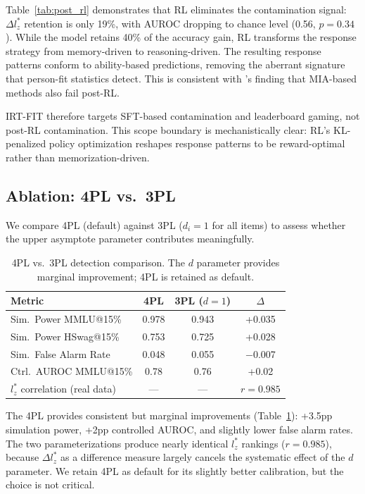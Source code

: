 \documentclass[11pt,a4paper]{article}
\begin{document}
Table~\ref{tab:post_rl} demonstrates that RL eliminates the contamination signal: $\Delta l_z^*$ retention is only 19\%, with AUROC dropping to chance level (0.56, $p=0.34$). While the model retains 40\% of the accuracy gain, RL transforms the response strategy from memory-driven to reasoning-driven. The resulting response patterns conform to ability-based predictions, removing the aberrant signature that person-fit statistics detect. This is consistent with \citet{wang2025contamination}'s finding that MIA-based methods also fail post-RL.

IRT-FIT therefore targets SFT-based contamination and leaderboard gaming, not post-RL contamination. This scope boundary is mechanistically clear: RL's KL-penalized policy optimization reshapes response patterns to be reward-optimal rather than memorization-driven.


\subsection{Ablation: 4PL vs.\ 3PL}
\label{sec:ablation}

We compare 4PL (default) against 3PL ($d_i=1$ for all items) to assess whether the upper asymptote parameter contributes meaningfully.

\begin{table}[t]
\centering
\small
\caption{4PL vs.\ 3PL detection comparison. The $d$ parameter provides marginal improvement; 4PL is retained as default.}
\label{tab:4pl3pl}
\begin{tabular}{lccc}
\toprule
Metric & 4PL & 3PL ($d{=}1$) & $\Delta$ \\
\midrule
Sim.\ Power MMLU@15\% & 0.978 & 0.943 & +0.035 \\
Sim.\ Power HSwag@15\% & 0.753 & 0.725 & +0.028 \\
Sim.\ False Alarm Rate & 0.048 & 0.055 & $-$0.007 \\
Ctrl.\ AUROC MMLU@15\% & 0.78 & 0.76 & +0.02 \\
$l_z^*$ correlation (real data) & --- & --- & $r=0.985$ \\
\bottomrule
\end{tabular}
\end{table}

The 4PL provides consistent but marginal improvements (Table~\ref{tab:4pl3pl}): +3.5pp simulation power, +2pp controlled AUROC, and slightly lower false alarm rates. The two parameterizations produce nearly identical $l_z^*$ rankings ($r=0.985$), because $\Delta l_z^*$ as a difference measure largely cancels the systematic effect of the $d$ parameter. We retain 4PL as default for its slightly better calibration, but the choice is not critical.
\end{document}
